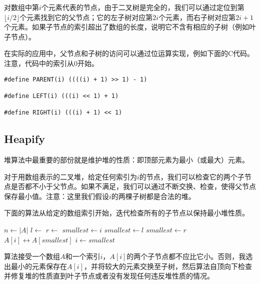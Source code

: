 \documentclass[UTF8]{article}
\begin{document}
对数组中第$i$个元素代表的节点，由于二叉树是完全的，我们可以通过定位到第$\lfloor i/2 \rfloor$个元素找到它的父节点；它的左子树对应第$2i$个元素，而右子树对应第$2i+1$个元素。如果子节点的索引超出了数组的长度，说明它不含有相应的子树（例如叶子节点）。

在实际的应用中，父节点和子树的访问可以通过位运算实现，例如下面的C代码。注意，代码中的索引从0开始。

\lstset{language=C}
\begin{lstlisting}
#define PARENT(i) ((((i) + 1) >> 1) - 1)

#define LEFT(i) (((i) << 1) + 1)

#define RIGHT(i) (((i) + 1) << 1)
\end{lstlisting}

\subsection{Heapify}

堆算法中最重要的部份就是维护堆的性质：即顶部元素为最小（或最大）元素。

对于用数组表示的二叉堆，给定任何索引为$i$的节点，我们可以检查它的两个子节点是否都不小于父节点。如果不满足，我们可以通过不断交换、检查，使得父节点保存最小值\cite{CLRS}。注意：这里我们假设$i$的两棵子树都是合法的堆。

下面的算法从给定的数组索引开始，迭代检查所有的子节点以保持最小堆性质。

\begin{algorithmic}[1]
  \State $n \gets |A|$
  \Loop
    \State $l \gets$ 
    \State $r \gets$ 
    \State $smallest \gets i$
      \State $smallest \gets l$
    \EndIf
      \State $smallest \gets r$
    \EndIf
      \State {} $A[i] \leftrightarrow A[smallest]$
      \State $i \gets smallest$
    \Else
      \State \Return
    \EndIf
  \EndLoop
\EndFunction
\end{algorithmic}

算法接受一个数组$A$和一个索引$i$，$A[i]$的两个子节点都不应比它小。否则，我选出最小的元素保存在$A[i]$，并将较大的元素交换至子树，然后算法自顶向下检查并修复堆的性质直到叶子节点或者没有发现任何违反堆性质的情况。
\end{document}
